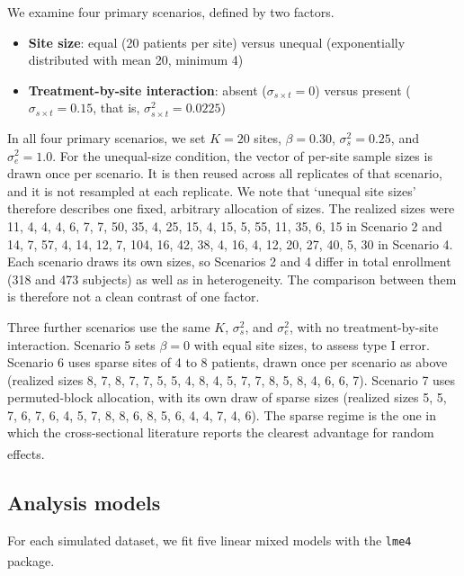 \documentclass[
  11pt,
]{article}
\begin{document}
We examine four primary scenarios, defined by two factors.

\begin{itemize}
  \item \textbf{Site size}: equal (20 patients per site) versus
    unequal (exponentially distributed with mean 20,
    minimum 4)
  \item \textbf{Treatment-by-site interaction}: absent
    ($\sigma_{s \times t} = 0$) versus present
    ($\sigma_{s \times t} = 0.15$, that is,
    $\sigma^2_{s \times t} = 0.0225$)
\end{itemize}

In all four primary scenarios, we set \(K = 20\) sites,
\(\beta = 0.30\), \(\sigma^2_s = 0.25\), and \(\sigma^2_e = 1.0\). For
the unequal-size condition, the vector of per-site sample sizes is
drawn once per scenario. It is then reused across all replicates of
that scenario, and it is not resampled at each replicate. We note
that `unequal site sizes' therefore describes one fixed, arbitrary
allocation of sizes. The realized sizes were
11, 4, 4, 4, 6, 7, 7, 50, 35, 4, 25, 15, 4, 15, 5, 55, 11, 35, 6, 15
in Scenario 2 and
14, 7, 57, 4, 14, 12, 7, 104, 16, 42, 38, 4, 16, 4, 12, 20, 27, 40, 5, 30
in Scenario 4. Each scenario draws its own sizes, so Scenarios 2
and 4 differ in total enrollment
(318 and
473 subjects) as well as in
heterogeneity. The comparison between them is therefore not a clean
contrast of one factor.

Three further scenarios use the same \(K\), \(\sigma^2_s\), and
\(\sigma^2_e\), with no treatment-by-site interaction. Scenario 5
sets \(\beta = 0\) with equal site sizes, to assess type I error.
Scenario 6 uses sparse sites of 4 to 8 patients, drawn once per
scenario as above (realized sizes
8, 7, 8, 7, 7, 5, 5, 4, 8, 4, 5, 7, 7, 8, 5, 8, 4, 6, 6, 7).
Scenario 7 uses permuted-block allocation, with its own draw of
sparse sizes (realized sizes
5, 5, 7, 6, 7, 6, 4, 5, 7, 8, 8, 6, 8, 5, 6, 4, 4, 7, 4, 6).
The sparse regime is the one in which the cross-sectional
literature reports the clearest advantage for random effects\textsuperscript{}.

\subsection{Analysis models}\label{analysis-models}

For each simulated dataset, we fit five linear mixed models with
the \texttt{lme4} package\textsuperscript{}.
\end{document}
